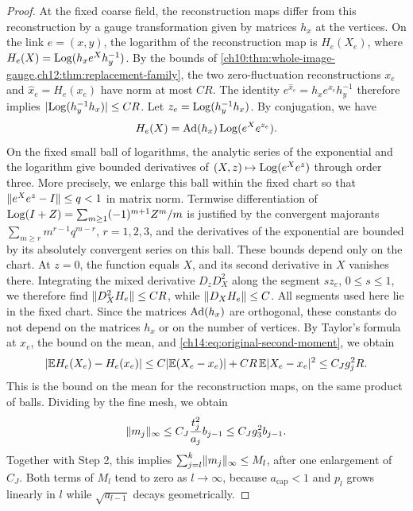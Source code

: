 \begin{proof}
At the fixed coarse field, the reconstruction maps differ from this reconstruction by a gauge transformation given by matrices $h_x$ at the vertices. On the link $e=(x,y)$, the logarithm of the reconstruction map is $H_e(X_e)$, where $H_e(X)=\operatorname{Log}(h_xe^Xh_y^{-1})$. By the bounds of \cref{ch10:thm:whole-image-gauge,ch12:thm:replacement-family}, the two zero-fluctuation reconstructions $x_e$ and $\widehat x_e=H_e(x_e)$ have norm at most $CR$. The identity $e^{\widehat x_e}=h_xe^{x_e}h_y^{-1}$ therefore implies $\lvert \operatorname{Log}(h_y^{-1}h_x)\rvert\le CR$. Let $z_e=\operatorname{Log}(h_y^{-1}h_x)$. By conjugation, we have
\[
 H_e(X)=\operatorname{Ad}(h_x)\operatorname{Log}(e^Xe^{z_e}).
\]
On the fixed small ball of logarithms, the analytic series of the exponential and the logarithm give bounded derivatives of $(X,z)\mapsto\operatorname{Log}(e^Xe^z)$ through order three. More precisely, we enlarge this ball within the fixed chart so that $\lVert e^Xe^z-I\rVert\le q<1$ in matrix norm. Termwise differentiation of $\operatorname{Log}(I+Z)=\sum_{m\ge1}(-1)^{m+1}Z^m/m$ is justified by the convergent majorants $\sum_{m\ge r}m^{r-1}q^{m-r}$, $r=1,2,3$, and the derivatives of the exponential are bounded by its absolutely convergent series on this ball. These bounds depend only on the chart. At $z=0$, the function equals $X$, and its second derivative in $X$ vanishes there. Integrating the mixed derivative $D_zD_X^2$ along the segment $sz_e$, $0\le s\le1$, we therefore find $\lVert D_X^2H_e\rVert\le CR$, while $\lVert D_XH_e\rVert\le C$. All segments used here lie in the fixed chart. Since the matrices $\operatorname{Ad}(h_x)$ are orthogonal, these constants do not depend on the matrices $h_x$ or on the number of vertices. By Taylor's formula at $x_e$, the bound on the mean, and \eqref{ch14:eq:original-second-moment}, we obtain
\[
 \lvert \mathbb E H_e(X_e)-H_e(x_e)\rvert\le C\lvert \mathbb E(X_e-x_e)\rvert+CR\,\mathbb E\lvert X_e-x_e\rvert^2\le C_Jg_j^2R.
\]
This is the bound on the mean for the reconstruction maps, on the same product of balls. Dividing by the fine mesh, we obtain
\[
 \lVert m_j\rVert_\infty\le C_J\frac{t_j^2}{a_j}b_{j-1}\le C_Jg_3^2b_{j-1}.
\]
Together with Step 2, this implies $\sum_{j=l}^k\lVert m_j\rVert_\infty\le M_l$, after one enlargement of $C_J$. Both terms of $M_l$ tend to zero as $l\to\infty$, because $a_{\mathrm{cap}}<1$ and $p_l$ grows linearly in $l$ while $\sqrt{a_{l-1}}$ decays geometrically.


\end{proof}

